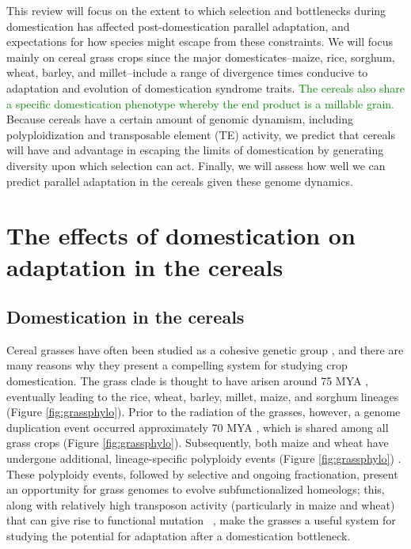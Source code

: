 \documentclass[12pt]{article}
\newcommand{\mw}[1]{\textcolor{green}{\normalsize #1}}
\begin{document}
This review will focus on the extent to which selection and bottlenecks during domestication has affected post-domestication parallel adaptation, and expectations for how species might escape from these constraints.
We will focus mainly on cereal grass crops since the major domesticates--maize, rice, sorghum, wheat, barley, and millet--include a range of divergence times conducive to adaptation and evolution of domestication syndrome traits. 
\mw{The cereals also share a specific domestication phenotype whereby the end product is a millable grain.}
Because cereals have a certain amount of genomic dynamism, including polyploidization and transposable element (TE) activity, we predict that cereals will have and advantage in escaping the limits of domestication by generating diversity upon which selection can act. Finally, we will assess how well we can predict parallel adaptation in the cereals given these genome dynamics.
\paragraph{}

\section*{The effects of domestication on adaptation in the cereals}

\subsection*{Domestication in the cereals}
Cereal grasses have often been studied as a cohesive genetic group \citep{pmid8379002, pmid11244100}, and there are many reasons why they present a compelling system for studying crop domestication.
The grass clade is thought to have arisen around 75 MYA \citep{BOUCHENAKKHELLADI2010, Kellogg2001}, eventually leading to the rice, wheat, barley, millet, maize, and sorghum lineages (Figure \ref{fig:grassphylo}).
Prior to the radiation of the grasses, however, a genome duplication event occurred approximately 70 MYA \citep{Paterson2004}, which is shared among all grass crops (Figure \ref{fig:grassphylo}).
Subsequently, both maize and wheat have undergone additional, lineage-specific polyploidy events (Figure \ref{fig:grassphylo}) \citep{Levy2002}.
These polyploidy events, followed by selective and ongoing fractionation, present an opportunity for grass genomes to evolve subfunctionalized homeologs; this, along with relatively high transposon activity (particularly in maize and wheat) that can give rise to functional mutation ~\citep{Wicker2016, Lisch2001}, make the grasses a useful system for studying the potential for adaptation after a domestication bottleneck.
\end{document}
